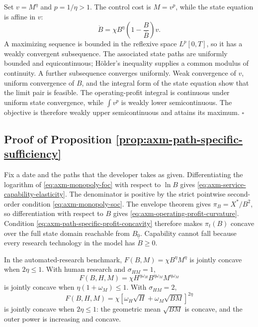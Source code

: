 Set \(v=M^\eta\) and \(p=1/\eta>1\). The control cost is
\(M=v^p\), while the state equation is affine in \(v\):
\[
 \dot B=\chi B^\eta\left(1-\frac{B}{\overline B}\right)v.
\]
A maximizing sequence is bounded in the reflexive space \(L^p[0,T]\), so it
has a weakly convergent subsequence. The associated state paths are uniformly
bounded and equicontinuous; H\"older's inequality supplies a common modulus of
continuity. A further subsequence converges uniformly. Weak convergence of
\(v\), uniform convergence of \(B\), and the integral form of the state
equation show that the limit pair is feasible. The operating-profit integral
is continuous under uniform state convergence, while \(\int v^p\) is weakly
lower semicontinuous. The objective is therefore weakly upper semicontinuous
and attains its maximum. \(\square\)

\subsection{Proof of Proposition \ref{prop:axm-path-specific-sufficiency}}

Fix a date and the paths that the developer takes as given. Differentiating
the logarithm of \eqref{eq:axm-monopoly-foc} with respect to \(\ln B\) gives
\eqref{eq:axm-service-capability-elasticity}. The denominator is positive by
the strict pointwise second-order condition
\eqref{eq:axm-monopoly-soc}. The envelope theorem gives
\(\pi_B=X^*/B^2\), so differentiation with respect to \(B\) gives
\eqref{eq:axm-operating-profit-curvature}. Condition
\eqref{eq:axm-path-specific-profit-concavity} therefore makes
\(\pi_t(B)\) concave over the full state domain reachable from \(B_0\).
Capability cannot fall because every research technology in the model has
\(\dot B\geq0\).

In the automated-research benchmark,
\(F(B,M)=\chi B^\eta M^\eta\) is jointly concave when \(2\eta\leq1\). With
human research and \(\sigma_{HM}=1\),
\[
 F(B,H,M)=\chi H^{\eta\omega_H}
 B^{\eta\omega_M}M^{\eta\omega_M}
\]
is jointly concave when \(\eta(1+\omega_M)\leq1\). With
\(\sigma_{HM}=2\),
\[
 F(B,H,M)=\chi\left[\omega_H\sqrt H+
 \omega_M\sqrt{BM}\right]^{2\eta}
\]
is jointly concave when \(2\eta\leq1\): the geometric mean
\(\sqrt{BM}\) is concave, and the outer power is increasing and concave.

